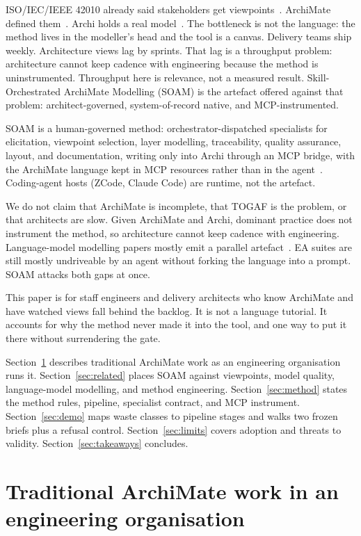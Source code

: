 \documentclass[10pt,journal,compsoc]{IEEEtran}
\begin{document}
ISO/IEC/IEEE 42010 already said stakeholders get viewpoints~\cite{iso42010}. ArchiMate defined them~\cite{archimate32}. Archi holds a real model~\cite{archi}. The bottleneck is not the language: the method lives in the modeller's head and the tool is a canvas. Delivery teams ship weekly. Architecture views lag by sprints. That lag is a throughput problem: architecture cannot keep cadence with engineering because the method is uninstrumented. Throughput here is relevance, not a measured result. Skill-Orchestrated ArchiMate Modelling (SOAM) is the artefact offered against that problem: architect-governed, system-of-record native, and MCP-instrumented.

SOAM is a human-governed method: orchestrator-dispatched specialists for elicitation, viewpoint selection, layer modelling, traceability, quality assurance, layout, and documentation, writing only into Archi through an MCP bridge, with the ArchiMate language kept in MCP resources rather than in the agent~\cite{jgsarchiskills,jgsarchibridge,mcp2025}. Coding-agent hosts (ZCode, Claude Code) are runtime, not the artefact.

We do not claim that ArchiMate is incomplete, that TOGAF is the problem, or that architects are slow. Given ArchiMate and Archi, dominant practice does not instrument the method, so architecture cannot keep cadence with engineering. Language-model modelling papers mostly emit a parallel artefact~\cite{camara2023,fill2023}. EA suites are still mostly undriveable by an agent without forking the language into a prompt. SOAM attacks both gaps at once.

This paper is for staff engineers and delivery architects who know ArchiMate and have watched views fall behind the backlog. It is not a language tutorial. It accounts for why the method never made it into the tool, and one way to put it there without surrendering the gate.

Section~\ref{sec:practice} describes traditional ArchiMate work as an engineering organisation runs it. Section~\ref{sec:related} places SOAM against viewpoints, model quality, language-model modelling, and method engineering. Section~\ref{sec:method} states the method rules, pipeline, specialist contract, and MCP instrument. Section~\ref{sec:demo} maps waste classes to pipeline stages and walks two frozen briefs plus a refusal control. Section~\ref{sec:limits} covers adoption and threats to validity. Section~\ref{sec:takeaways} concludes.

\section{Traditional ArchiMate work in an engineering organisation}
\label{sec:practice}
\end{document}

